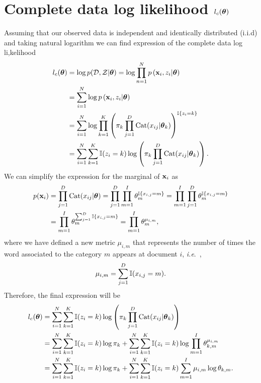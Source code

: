 \documentclass[12pt]{article}
\begin{document}
\section{Complete data log likelihood $l_c(\boldsymbol\theta) $}
\noindent Assuming that our observed data is independent and identically distributed (i.i.d) and taking natural logarithm we can find expression of the complete data log li,kelihood
\begin{align}
l_c(\boldsymbol\theta) & = \log p(\mathcal{D},\mathcal{Z}|\boldsymbol\theta) = \log \prod\limits_{n=1}^{N} p\left(\mathbf{x}_{i},z_{i}|\boldsymbol\theta\right)\\
& = \sum_{i=1}^{N}\log p\left(\mathbf{x}_{i},z_{i}|\boldsymbol\theta\right)\\
& = \sum_{i=1}^{N} \log \prod\limits_{k=1}^{K}\left( \pi_{k} \prod \limits_{j=1}^{D} \text{Cat}(x_{ij}|\boldsymbol\theta_{k}) \right)^{\mathbb{I}\lbrace z_{i}=k \rbrace}\\
& = \sum_{i=1}^N\sum_{k=1}^K\mathbb{I} (z_i=k) \log\left( \pi_k\prod_{j=1}^D\operatorname{\mathrm{Cat}}(x_{ij}|\boldsymbol\theta_k)\right).
\end{align}
We can simplify the expression for the marginal of $\mathbf{x}_i$ as
\begin{align}\label{eq:marginal_x}
    p(\mathbf{x}_i) & = \prod_{j=1}^D\operatorname{\mathrm{Cat}}(x_{ij}|\boldsymbol\theta) = \prod_{j=1}^D\prod_{m=1}^I\theta_m^{\mathbb{I} \lbrace x_{i,j}=m \rbrace} = \prod_{m=1}^I\prod_{j=1}^D\theta_m^{\mathbb{I} \lbrace x_{i,j}=m \rbrace } \\
    & = \prod_{m=1}^I\theta_m^{\sum_{j=1}^D {\mathbb{I} \lbrace x_{i,j}=m \rbrace }} = \prod_{m=1}^I \theta_m^{\mu_{i,m}},
\end{align}
where we have defined a new metric $\mu_{i,m}$ that represents the number of times the word associated to the category $m$ appears at document $i$, \textit{i.e}.\ ,
\begin{equation}
    \mu_{i,m} = \sum_{j=1}^D {\mathbb{I}(x_{i,j}=m)}.
\end{equation}
Therefore, the final expression will be 
\begin{align}
    l_c(\boldsymbol\theta) & = \sum_{i=1}^N\sum_{k=1}^K\mathbb{I} (z_i=k) \log\left( \pi_k\prod_{j=1}^D\operatorname{\mathrm{Cat}}(x_{ij}|\boldsymbol\theta_k)\right) \\
    & =  \sum_{i=1}^N\sum_{k=1}^K\mathbb{I} (z_i=k) \log \pi_k + \sum_{i=1}^N\sum_{k=1}^K\mathbb{I} (z_i=k) \log \prod_{m=1}^I \theta_{k,m}^{\mu_{i,m}}\\
    & = \sum_{i=1}^N\sum_{k=1}^K\mathbb{I} (z_i=k) \log \pi_k + \sum_{i=1}^N\sum_{k=1}^K\mathbb{I} (z_i=k) \sum_{m=1}^I \mu_{i,m}\log \theta_{k,m} \label{eq:log_li,ke}.
\end{align}
    
\end{document}
